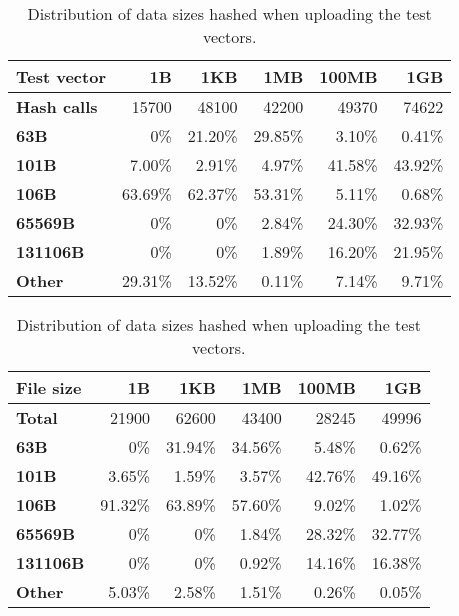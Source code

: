 \begin{table}
  \centering
  \begin{tabular}{ | l | r | r | r | r | r | }
    \hline
    \textbf{Test vector}  &   1B       &  1KB      &  1MB      &  100MB    &  1GB      \\ \hline
    \textbf{Hash calls}   &   15700    &  48100    &  42200    &  49370    &  74622    \\ \hline
    \textbf{63B}          &   0\%      &  21.20\%  &  29.85\%  &  3.10\%   &  0.41\%   \\ \hline
    \textbf{101B}         &   7.00\%   &  2.91\%   &  4.97\%   &  41.58\%  &  43.92\%  \\ \hline
    \textbf{106B}         &   63.69\%  &  62.37\%  &  53.31\%  &  5.11\%   &  0.68\%   \\ \hline
    \textbf{65569B}       &   0\%      &  0\%      &  2.84\%   &  24.30\%  &  32.93\%  \\ \hline
    \textbf{131106B}      &   0\%      &  0\%      &  1.89\%   &  16.20\%  &  21.95\%  \\ \hline
    \textbf{Other}        &   29.31\%  &  13.52\%  &  0.11\%   &  7.14\%   &  9.71\%   \\ \hline
  \end{tabular}
  \caption{Distribution of data sizes hashed when uploading the test vectors.}
  \label{tbl:tahoe:datauploaded}
\end{table}


\begin{table}
  \centering
  \begin{tabular}{ | l | r | r | r | r | r | }
    \hline
    \textbf{File size} &  1B       &  1KB      &  1MB      &  100MB    &  1GB      \\  \hline
    \textbf{Total}     &  21900    &  62600    &  43400    &  28245    &  49996    \\  \hline
    \textbf{63B}       &  0\%      &  31.94\%  &  34.56\%  &  5.48\%   &  0.62\%   \\  \hline
    \textbf{101B}      &  3.65\%   &  1.59\%   &  3.57\%   &  42.76\%  &  49.16\%  \\  \hline
    \textbf{106B}      &  91.32\%  &  63.89\%  &  57.60\%  &  9.02\%   &  1.02\%   \\  \hline
    \textbf{65569B}    &  0\%      &  0\%      &  1.84\%   &  28.32\%  &  32.77\%  \\  \hline
    \textbf{131106B}   &  0\%      &  0\%      &  0.92\%   &  14.16\%  &  16.38\%  \\  \hline
    \textbf{Other}     &  5.03\%   &  2.58\%   &  1.51\%   &  0.26\%   &  0.05\%   \\  \hline
  \end{tabular}
  \caption{Distribution of data sizes hashed when uploading the test vectors.}
  \label{tbl:tahoe:datadownloaded}
\end{table}
